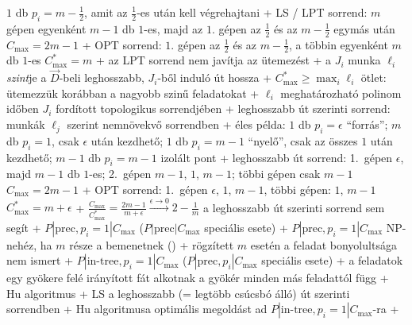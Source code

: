     $1$ db $p_i = m - \frac{1}{2}$, amit az $\frac{1}{2}$-es után
    kell végrehajtani
    + LS / LPT sorrend: $m$ gépen egyenként $m - 1$ db $1$-es, majd az
      $1$. gépen az $\frac{1}{2}$ és az $m - \frac{1}{2}$ egymás után \RA%
      $C_{\max} = 2m - 1$
    + OPT sorrend: $1$. gépen az $\frac{1}{2}$ és az $m -
      \frac{1}{2}$, a többin egyenként $m$ db $1$-es \RA $C_{\max}^* =
      m$
    + az LPT sorrend nem javítja az ütemezést
  + \dfn a $J_i$ munka $\ell_i$ \emph{szint}je a $\vec{D}$-beli
    leghosszabb, $J_i$-ből induló út hossza
    + $C_{\max}^* \ge \max_i \ell_i$ \RA ötlet: ütemezzük korábban a
      nagyobb szinű feladatokat
    + $\ell_i$ meghatározható polinom időben $J_i$ fordított
      topologikus sorrendjében
  + leghosszabb út szerinti sorrend: munkák $\ell_j$ szerint
    nemnövekvő sorrendben
  + éles példa: $1$ db $p_i = \epsilon$ ``forrás''; $m$ db $p_i = 1$,
    csak $\epsilon$ után kezdhető; $1$ db $p_i = m - 1$ ``nyelő'', csak
    az összes $1$ után kezdhető; $m - 1$ db $p_i = m - 1$ izolált pont
    + leghosszabb út sorrend: 1.~gépen $\epsilon$, majd $m - 1$ db
      $1$-es; 2.~gépen $m - 1$, $1$, $m - 1$; többi gépen csak $m - 1$
      \RA $C_{\max} = 2m - 1$
    + OPT sorrend: 1.~gépen $\epsilon$, $1$, $m - 1$, többi gépen:
      $1$, $m - 1$ \RA $C_{\max}^* = m + \epsilon$
    + $\frac{C_{\max}}{C_{\max}^*} = \frac{2m - 1}{m + \epsilon}
      \xrightarrow{\epsilon \to 0} 2 - \frac{1}{m}$ \RA a leghosszabb
      út szerinti sorrend sem segít
+ \prob $P|\textrm{prec}, p_i = 1|C_{\max}$
  ($P|\textrm{prec}|C_{\max}$ speciális esete)
  + \thm $P|\textrm{prec}, p_i = 1|C_{\max}$ NP-nehéz, ha $m$ része a
    bemenetnek (\noproof)
  + rögzített $m$ esetén a feladat bonyolultsága nem ismert
+ \prob $P|\textrm{in-tree}, p_i = 1|C_{\max}$
  ($P|\textrm{prec}, p_i|C_{\max}$ speciális esete)
  + a feladatok egy gyökere felé irányított fát alkotnak \RA a gyökér
    minden más feladattól függ
  + \alg Hu algoritmus
    + LS a leghosszabb (= legtöbb csúcsbó álló) út szerinti sorrendben
    + \thm Hu algoritmusa optimális megoldást ad $P|\textrm{in-tree},
      p_i = 1|C_{\max}$-ra
      + \noproof
